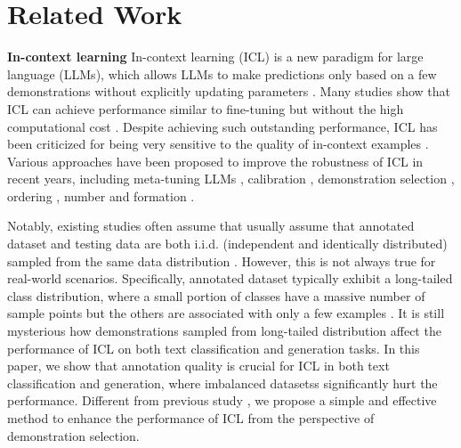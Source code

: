 \section{Related Work}
\textbf{In-context learning} In-context learning (ICL) is a new paradigm for large language (LLMs), which allows LLMs to make predictions only based on a few demonstrations without explicitly updating parameters \citep{akyrek2023what,hendel2023context,agarwal2024many, dong2024survey,edwards-camacho-collados-2024-language,falck2024martingale}. Many studies show that ICL can achieve performance similar to fine-tuning but without the high computational cost \citep{gonen-etal-2023-demystifying, mosbach-etal-2023-shot,muller2024bayes,panwar2024incontext}. Despite achieving such outstanding performance, ICL has been criticized for being very sensitive to the quality of in-context examples \citep{fei-etal-2023-mitigating,gao2024noise}. Various approaches have been proposed to improve the robustness of ICL in recent years, including meta-tuning LLMs \citep{brunet2023icl}, calibration \citep{abbas2024enhancing},  demonstration selection \citep{zhang-etal-2022-active,nguyen2023context,qin2023context,ye-etal-2023-complementary,gao2024unifying,luo2024context,mo-etal-2024-c}, ordering \citep{lu-etal-2022-fantastically,liu2024let}, number \citep{zhang2025more} and formation \citep{voronov2024mind, yao-etal-2024-samples}.  

Notably, existing studies often assume that usually assume that annotated dataset and testing data are both i.i.d. (independent and identically distributed) sampled from the same data distribution \citep{luo2024context,van2024context}. However, this is not always true for real-world scenarios. Specifically, annotated dataset typically exhibit a long-tailed class distribution, where a small portion of classes have a massive number of sample points but the others are associated with only a few examples \citep{jamal2020rethinking,schultheis2024generalized}. It is still mysterious how demonstrations sampled from long-tailed distribution affect the performance of ICL on both text classification and generation tasks. In this paper, we show that annotation quality is crucial for ICL in both text classification and generation, where imbalanced datasetss significantly hurt the performance. Different from previous study \citep{hong2024mixtures},  we propose a simple and effective method to enhance the performance of ICL from the perspective of demonstration selection.



